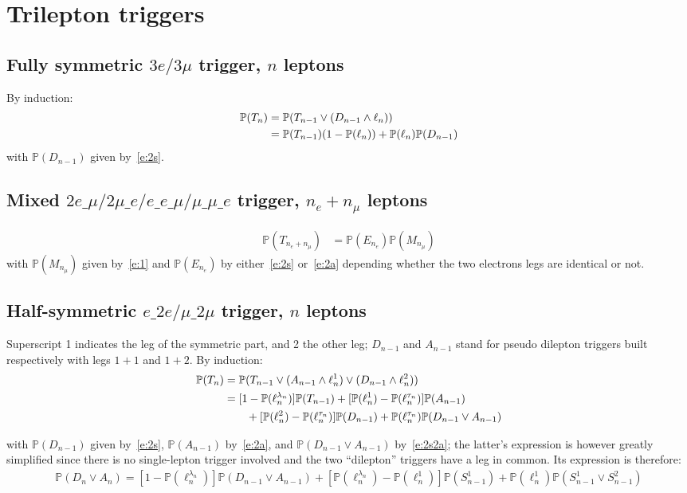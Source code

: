 \documentclass{article}
\newcommand{\pro}{\ensuremath{\mathbb{P}}}
\begin{document}
\section{Trilepton triggers}

\subsection{Fully symmetric $3e/3\mu$ trigger, $n$ leptons}
By induction:
\begin{align}
\pro(T_n) &= \pro(T_{n-1} \vee (D_{n-1}\wedge \ell_n))\notag\\
&= \pro(T_{n-1})(1-\pro(\ell_n)) + \pro(\ell_n)\pro(D_{n-1})
\label{e:3s}
\end{align}
with $\pro(D_{n-1})$ given by~\ref{e:2s}. 

\subsection{Mixed $2e\_\mu/2\mu\_e/e\_e\_\mu/\mu\_\mu\_e$ trigger, $n_e+n_\mu$ leptons}


\begin{align}
\pro(T_{n_e+n_\mu}) &= \pro(E_{n_e})\pro(M_{n_\mu})
\end{align}
with $\pro(M_{n_\mu})$ given by~\ref{e:1} and $\pro(E_{n_e})$ by either~\ref{e:2s} or~\ref{e:2a} 
depending whether the two electrons legs are identical or not. 




\subsection{Half-symmetric $e\_2e/\mu\_2\mu$ trigger, $n$ leptons}
Superscript 1 indicates the leg of the symmetric part, and 2 the other leg; $D_{n-1}$ 
and $A_{n-1}$ stand for pseudo dilepton triggers built respectively with legs $1+1$ and $1+2$. 
By induction: 
\begin{align}
\pro(T_n) &= \pro(T_{n-1} \vee (A_{n-1}\wedge \ell_n^1) \vee (D_{n-1}\wedge \ell_n^2))\notag\\
&= [1-\pro(\ell_n^{\lambda_n})]\pro(T_{n-1}) +  [\pro(\ell_n^1) - \pro(\ell_n^{\tau_n})]\pro(A_{n-1})\notag\\
&\qquad+ [\pro(\ell_n^2) - \pro(\ell_n^{\tau_n})]\pro(D_{n-1})
+ \pro(\ell_n^{\tau_n})\pro(D_{n-1}\vee A_{n-1})
\end{align}

with $\pro(D_{n-1})$ given by~\ref{e:2s}, $\pro(A_{n-1})$ by~\ref{e:2a}, 
 and $\pro(D_{n-1}\vee A_{n-1})$ by~\ref{e:2s2a}; 
the latter's expression is however greatly simplified since there is no single-lepton trigger involved 
and the two ``dilepton'' triggers have a leg in common. 
Its expression is therefore: 
\begin{align}
\pro(D_{n}\vee A_{n}) = [1-\pro(\ell_n^{\lambda_n})]\pro(D_{n-1}\vee A_{n-1}) + [\pro(\ell_n^{\lambda_n})-\pro(\ell_n^1)]\pro(S_{n-1}^1)
+\pro(\ell_n^1)\pro(S_{n-1}^1\vee S_{n-1}^2) 
\end{align}
\end{document}
